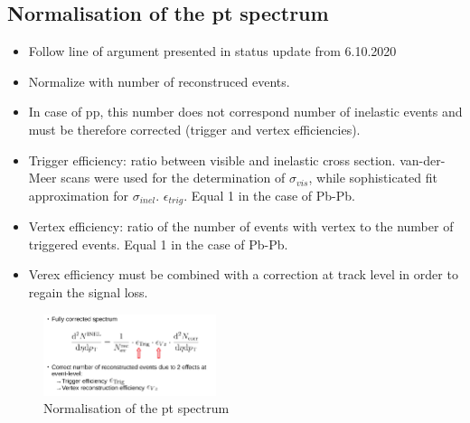 \documentclass[12pt,a4paper]{report}
\begin{document}
\subsection{Normalisation of the pt spectrum}
\begin{itemize}
\item Follow line of argument presented in status update from 6.10.2020
\item Normalize with number of reconstruced events.
\item In case of pp, this number does not correspond number of inelastic events and must be therefore corrected (trigger and vertex efficiencies).
\item Trigger efficiency: ratio between visible and inelastic cross section. van-der-Meer scans were used for the determination of $\sigma_{vis}$, while sophisticated fit approximation for $\sigma_{inel}$. $\epsilon_{trig}$. Equal 1 in the case of Pb-Pb.
\item Vertex efficiency: ratio of the number of events with vertex to the number of triggered events. Equal 1 in the case of Pb-Pb.
\item Verex efficiency must be combined with a correction at track level in order to regain the signal loss.
\end{itemize}
\begin{figure}[tb!]
\centering
\includegraphics[width=0.45\textwidth]{Plots/DefinitionOfTheSpectrum.png} 
\caption{Normalisation of the pt spectrum} 
\end{figure}
\end{document}
